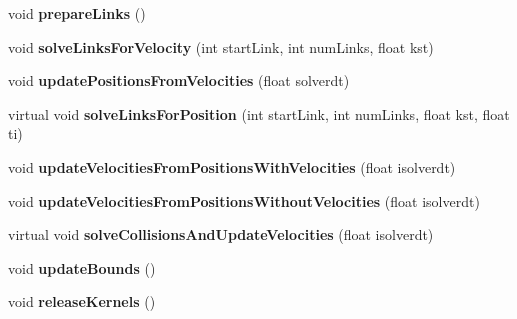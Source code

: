 \begin{DoxyCompactItemize}
\item 
\mbox{\label{classbtOpenCLSoftBodySolver_aed3065d7877dc780cf89fcf777d255ba}} 
void {\bfseries prepare\+Links} ()
\item 
\mbox{\label{classbtOpenCLSoftBodySolver_ac1a2fbaa31b4caa8c5ff362f6d0b3473}} 
void {\bfseries solve\+Links\+For\+Velocity} (int start\+Link, int num\+Links, float kst)
\item 
\mbox{\label{classbtOpenCLSoftBodySolver_a72f132c1c1fb8646399798aa05550f1a}} 
void {\bfseries update\+Positions\+From\+Velocities} (float solverdt)
\item 
\mbox{\label{classbtOpenCLSoftBodySolver_a3dbaa97c987b87a887498452816af385}} 
virtual void {\bfseries solve\+Links\+For\+Position} (int start\+Link, int num\+Links, float kst, float ti)
\item 
\mbox{\label{classbtOpenCLSoftBodySolver_a20ce37361e0082884415ca2c3067a31c}} 
void {\bfseries update\+Velocities\+From\+Positions\+With\+Velocities} (float isolverdt)
\item 
\mbox{\label{classbtOpenCLSoftBodySolver_a7ec6d83da33181aefe0d1fe49fcad792}} 
void {\bfseries update\+Velocities\+From\+Positions\+Without\+Velocities} (float isolverdt)
\item 
\mbox{\label{classbtOpenCLSoftBodySolver_a615a80b2af9b961f1c774770e96f0213}} 
virtual void {\bfseries solve\+Collisions\+And\+Update\+Velocities} (float isolverdt)
\item 
\mbox{\label{classbtOpenCLSoftBodySolver_a46f876bcacba9b8d4b08b52508c407e7}} 
void {\bfseries update\+Bounds} ()
\item 
\mbox{\label{classbtOpenCLSoftBodySolver_a6f5a41ef99b636508c67e1de1083902f}} 
void {\bfseries release\+Kernels} ()
\end{DoxyCompactItemize}

